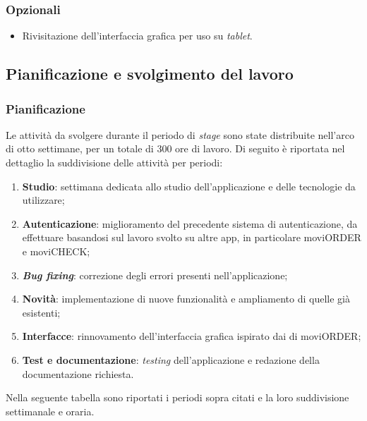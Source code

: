 \subsubsection{Opzionali}

\begin{itemize}
    \item Rivisitazione dell'interfaccia grafica per uso su \textit{tablet}.
\end{itemize}


\subsection{Pianificazione e svolgimento del lavoro}

\subsubsection{Pianificazione}

Le attività da svolgere durante il periodo di \textit{stage} sono state distribuite nell'arco di otto settimane, per un totale di 300 ore di lavoro. Di seguito è riportata nel dettaglio la suddivisione delle attività per periodi:
\begin{enumerate}
    \item \textbf{Studio}: settimana dedicata allo studio dell'applicazione e delle tecnologie da utilizzare;
    \item \textbf{Autenticazione}: miglioramento del precedente sistema di autenticazione, da effettuare basandosi sul lavoro svolto su altre app, in particolare moviORDER e moviCHECK;
    \item \textbf{\textit{Bug fixing}}: correzione degli errori presenti nell'applicazione;
    \item \textbf{Novità}: implementazione di nuove funzionalità e ampliamento di quelle già esistenti;
    \item \textbf{Interfacce}: rinnovamento dell'interfaccia grafica ispirato dai \textit{} di moviORDER;
    \item \textbf{Test e documentazione}: \textit{testing} dell'applicazione e redazione della documentazione richiesta.
\end{enumerate}
Nella seguente tabella sono riportati i periodi sopra citati e la loro suddivisione settimanale e oraria.

